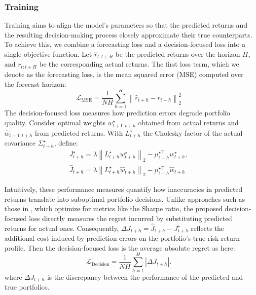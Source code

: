 \subsubsection{Training} Training aims to align the model’s parameters so that the predicted returns and the resulting decision-making process closely approximate their true counterparts. To achieve this, we combine a forecasting loss and a decision-focused loss into a single objective function. Let $\hat{r}_{t:t+H}$ be the predicted returns over the horizon $H$, and $r_{t:t+H}$ be the corresponding actual returns. The first loss term, which we denote as the forecasting loss, is the mean squared error (MSE) computed over the forecast horizon:
\begin{equation}
 \mathcal{L}_{\mathrm{MSE}}=\frac{1}{NH} \sum_{h=1}^H\left\|\hat{r}_{t+h}-r_{t+h}\right\|_2^2   
\end{equation}
The decision-focused loss measures how prediction errors degrade portfolio quality. Consider optimal weights $w_{t+1:t+h}^{\star}$ obtained from actual returns and $\hat{w}_{t+1:t+h}$ from predicted returns. With $L_{t+h}^{\star}$ the Cholesky factor of the actual covariance $\Sigma_{t+h}^{\star}$, define:
\begin{equation}
    \begin{gathered}
J_{t+h}^{\star}=\lambda\left\|L_{t+h}^{\star} w_{t+h}^{\star}\right\|_2-\mu_{t+h}^{\star \top} w_{t+h}^{\star}, \\
\hat{J}_{t+h}=\lambda\left\|L_{t+h}^{\star} \hat{w}_{t+h}\right\|_2-\mu_{t+h}^{\star \top} \hat{w}_{t+h} 
\end{gathered}
\label{eq:13}
\end{equation}

Intuitively, these performance measures quantify how inaccuracies in predicted returns translate into suboptimal portfolio decisions. Unlike approaches such as those in \citep{costa2023distributionally}, which optimize for metrics like the Sharpe ratio, the proposed decision-focused loss directly measures the regret incurred by substituting predicted returns for actual ones. Consequently, $\Delta J_{t+h} = \hat{J}_{t+h}-J_{t+h}^{\star}$ reflects the additional cost induced by prediction errors on the portfolio’s true risk-return profile. Then the decision-focused loss is the average absolute regret as here:
\begin{equation}
     \mathcal{L}_{\mathrm{Decision}}=\frac{1}{NH} \sum_{h=1}^H|\Delta J_{t+h}|.
\end{equation}
where $\Delta J_{t+h}$ is the discrepancy between the performance of the predicted and true portfolios. 

